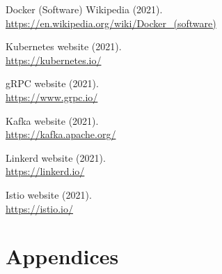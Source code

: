 \documentclass{article}
\newcommand{\vspaceconst}{-2ex}
\begin{document}
\begin{multicols}{2}





\newpage
\begin{thebibliography}{9}

  Docker (Software) Wikipedia (2021).\\
  \url{https://en.wikipedia.org/wiki/Docker_(software)}

  Kubernetes website (2021).\\
  \url{https://kubernetes.io/}

  gRPC website (2021).\\
  \url{https://www.grpc.io/}

  Kafka website (2021).\\
  \url{https://kafka.apache.org/}

  Linkerd website (2021).\\
  \url{https://linkerd.io/}

  Istio website (2021).\\
  \url{https://istio.io/}
\end{thebibliography}

\section*{Appendices}
\vspace{\vspaceconst}

\end{multicols}
\end{document}
